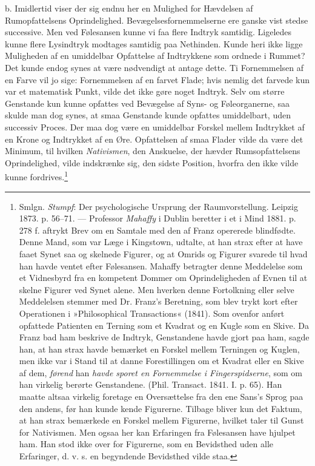 \documentclass[12pt,a4paper,openany]{book}
\newcommand{\opage}[1]{\marginnote{\footnotesize\textit{[#1]}}}
\begin{document}
b. Imidlertid viser der sig endnu her en Mulighed for Hævdelsen af
Rumopfattelsens Oprindelighed. Bevægelsesfornemmelserne ere ganske vist
stedse successive. Men ved Følesansen kunne vi faa flere Indtryk
samtidig. Ligeledes kunne flere Lysindtryk modtages samtidig paa
Nethinden. Kunde heri ikke ligge Muligheden af en umiddelbar Opfattelse
af Indtrykkene som ordnede i Rummet? Det kunde endog synes at være
nødvendigt at antage dette. Ti Fornemmelsen af en Farve vil jo sige:
Fornemmelsen af en farvet Flade; hvis nemlig det farvede kun var et
matematisk Punkt, vilde
\opage{243}det ikke gøre noget Indtryk. Selv om større Genstande kun
kunne opfattes ved Bevægelse af Syns- og Føleorganerne, saa skulde man
dog synes, at smaa Genstande kunde opfattes umiddelbart, uden successiv
Proces. Der maa dog være en umiddelbar Forskel mellem Indtrykket af en
Krone og Indtrykket af en Øre. Opfattelsen af smaa Flader vilde da være
det Minimum, til hvilken \emph{Nativismen}, den Anskuelse, der hævder
Rumsopfattelsens Oprindelighed, vilde indskrænke sig, den sidste
Position, hvorfra den ikke vilde kunne fordrives.\footnote[1]{Smlgn.
\emph{Stumpf}: Der psychologische Ursprung der Raumvorstellung. Leipzig
1873. p. 56--71. --- Professor \emph{Mahaffy} i Dublin beretter i et i
Mind 1881. p. 278 f. aftrykt Brev om en Samtale med den af Franz
opererede blindfødte. Denne Mand, som var Læge i Kingstown, udtalte, at
han strax efter at have faaet Synet saa og skelnede Figurer, og at
Omrids og Figurer svarede til hvad han havde ventet efter Følesansen.
Mahaffy betragter denne Meddelelse som et Vidnesbyrd fra en kompetent
Dommer om Oprindeligheden af Evnen til at skelne Figurer ved Synet
alene. Men hverken denne Fortolkning eller selve Meddelelsen stemmer med
Dr. Franz’s Beretning, som blev trykt kort efter Operationen i
»Philosophical Transactions« (1841). Som ovenfor anført opfattede
Patienten en Terning som et Kvadrat og en Kugle som en Skive. Da Franz
bad ham beskrive de Indtryk, Genstandene havde gjort paa ham, sagde han,
at han strax havde bemærket en Forskel mellem Terningen og Kuglen, men
ikke var i Stand til at danne Forestillingen om et Kvadrat eller en
Skive af dem, \emph{førend} han \emph{havde sporet en Fornemmelse i
Fingerspidserne}, som om han virkelig berørte Genstandene. (Phil.
Transact. 1841. I. p. 65). Han maatte altsaa virkelig foretage en
Oversættelse fra den ene Sans’s Sprog paa den andens, før han kunde
kende Figurerne. Tilbage bliver kun det Faktum, at han strax bemærkede
en Forskel mellem Figurerne, hvilket taler til Gunst for Nativismen. Men
ogsaa her kan Erfaringen fra Følesansen have hjulpet ham. Han stod ikke
over for Figurerne, som en Bevidsthed uden alle Erfaringer, d. v. s. en
begyndende Bevidsthed vilde staa.}
\end{document}

